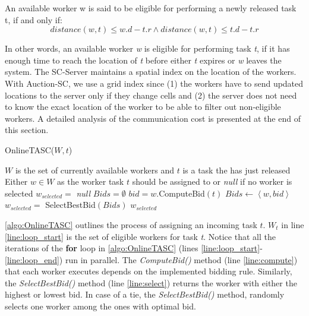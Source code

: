 \begin{definition} 
An available worker w is said to be eligible for performing a newly released task t, if and only if:
\begin{equation*}
distance(w, t) \leq w.d - t.r \wedge distance(w, t) \leq t.d - t.r
\end{equation*}
\end{definition}

\noindent In other words, an available worker \textit{w} is eligible for performing task \textit{t}, if it has enough time to reach the location of \textit{t} before either \textit{t} expires or \textit{w} leaves the system. The SC-Server maintains a spatial index on the location of the workers. With Auction-SC, we use a grid index since (1) the workers have to send updated locations to the server only if they change cells and (2) the server does not need to know the exact location of the worker to be able to filter out non-eligible workers. A detailed analysis of the communication cost is presented at the end of this section.

\begin{algorithm}
\caption{OnlineTASC($W, t$)}
\label{algo:OnlineTASC}
\begin{algorithmic}[1]
\REQUIRE $W$ is the set of currently available workers and $t$ is a task the has just released
\ENSURE Either $w \in W$ as the worker task $t$ should be assigned to or \emph{null} if no worker is selected
\STATE $w_{selected} = $ \emph{null}
\STATE $Bids = \emptyset$
 \label{line:loop_start}
	\STATE $bid = w$.ComputeBid$(t)$ \label{line:compute}
	\STATE $Bids \leftarrow \left\langle w, bid \right\rangle$
\ENDFOR \label{line:loop_end}
\STATE $w_{selected} = $ SelectBestBid$(Bids)$ \label{line:select}
\RETURN $w_{selected}$
\end{algorithmic}
\end{algorithm}

\cref{algo:OnlineTASC} outlines the process of assigning an incoming task $t$. $W_t$ in line \ref{line:loop_start} is the set of eligible workers for task \textit{t}. Notice that all the iterations of the \textbf{for} loop in \cref{algo:OnlineTASC} (lines \ref{line:loop_start}-\ref{line:loop_end}) run in parallel. The \emph{ComputeBid()} method (line \ref{line:compute}) that each worker executes depends on the implemented bidding rule. Similarly, the \emph{SelectBestBid()} method (line \ref{line:select}) returns the worker with either the highest or lowest bid. In case of a tie, the \emph{SelectBestBid()} method, randomly selects one worker among the ones with optimal bid.

